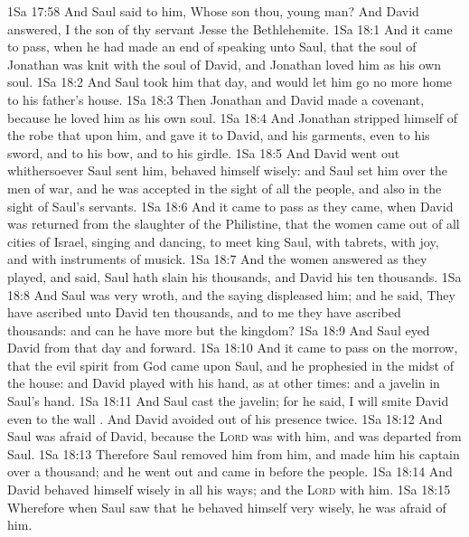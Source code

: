 \vs 1Sa 17:58 And Saul said to him, Whose son  thou,  young man? And David answered, I  the son of thy servant Jesse the Bethlehemite.
\vs 1Sa 18:1 And it came to pass, when he had made an end of speaking unto Saul, that the soul of Jonathan was knit with the soul of David, and Jonathan loved him as his own soul.
\vs 1Sa 18:2 And Saul took him that day, and would let him go no more home to his father's house.
\vs 1Sa 18:3 Then Jonathan and David made a covenant, because he loved him as his own soul.
\vs 1Sa 18:4 And Jonathan stripped himself of the robe that  upon him, and gave it to David, and his garments, even to his sword, and to his bow, and to his girdle.
\vs 1Sa 18:5 And David went out whithersoever Saul sent him,  behaved himself wisely: and Saul set him over the men of war, and he was accepted in the sight of all the people, and also in the sight of Saul's servants.
\vs 1Sa 18:6 And it came to pass as they came, when David was returned from the slaughter of the Philistine, that the women came out of all cities of Israel, singing and dancing, to meet king Saul, with tabrets, with joy, and with instruments of musick.
\vs 1Sa 18:7 And the women answered  as they played, and said, Saul hath slain his thousands, and David his ten thousands.
\vs 1Sa 18:8 And Saul was very wroth, and the saying displeased him; and he said, They have ascribed unto David ten thousands, and to me they have ascribed  thousands: and  can he have more but the kingdom?
\vs 1Sa 18:9 And Saul eyed David from that day and forward.
\vs 1Sa 18:10 And it came to pass on the morrow, that the evil spirit from God came upon Saul, and he prophesied in the midst of the house: and David played with his hand, as at other times: and  a javelin in Saul's hand.
\vs 1Sa 18:11 And Saul cast the javelin; for he said, I will smite David even to the wall . And David avoided out of his presence twice.
\vs 1Sa 18:12 And Saul was afraid of David, because the \textsc{Lord} was with him, and was departed from Saul.
\vs 1Sa 18:13 Therefore Saul removed him from him, and made him his captain over a thousand; and he went out and came in before the people.
\vs 1Sa 18:14 And David behaved himself wisely in all his ways; and the \textsc{Lord}  with him.
\vs 1Sa 18:15 Wherefore when Saul saw that he behaved himself very wisely, he was afraid of him.
